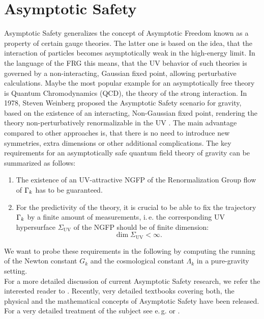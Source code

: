 \section{Asymptotic Safety}
Asymptotic Safety generalizes the concept of Asymptotic Freedom known as a property of certain gauge theories. The latter one is based on the idea, that the interaction of particles becomes asymptotically weak in the high-energy limit. In the language of the FRG this means, that the UV behavior of such theories is governed by a non-interacting, Gaussian fixed point,  allowing perturbative calculations. Maybe the most popular example for an asymptotically free theory is Quantum  Chromodynamics (QCD), the theory of the strong interaction. In 1978, Steven Weinberg proposed the Asymptotic Safety scenario for gravity, based on the existence of an interacting, Non-Gaussian fixed point, rendering the theory non-perturbatively renormalizable in the UV \cite{Weinberg1980}. The main advantage compared to other approaches is, that there is no need to introduce new symmetries, extra dimensions or other additional complications. The key requirements for an asymptotically safe quantum field theory of gravity can be summarized as follows: 
\begin{enumerate}
	\item The existence of an UV-attractive NGFP of the Renormalization Group flow of $\Gamma_{k}$ has to be guaranteed. 
	\item For the predictivity of the theory, it is crucial to be able to fix the trajectory $\Gamma_{k}$ by a finite amount of measurements, i.\,e. the corresponding UV hypersurface $\Sigma_{\mathrm{UV}}$ of the NGFP should be of finite dimension: 
	\begin{equation*}
		\operatorname{dim}\Sigma_{\mathrm{UV}} < \infty.
	\end{equation*} 
\end{enumerate} 
We want to probe these requirements in the following by computing the running of the Newton constant $G_k$ and the cosmological constant $\Lambda_k$ in a pure-gravity setting. \\
For a more detailed discussion of current Asymptotic Safety research, we refer the interested reader to \cite{Eichhorn2018}. Recently, very detailed textbooks covering both, the physical and the mathematical concepts of Asymptotic Safety have been released. For a very detailed treatment of the subject see e.\,g. \cite{Percacci2017} or \cite{ReuterSaueressig_2019}.
\vspace{-0.6cm}
